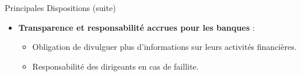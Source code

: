 \begin{frame}{Principales Dispositions (suite)}
    \begin{itemize}
        \item \textbf{Transparence et responsabilité accrues pour les banques} :
            \begin{itemize}
                \item Obligation de divulguer plus d'informations sur leurs activités financières.
                \item Responsabilité des dirigeants en cas de faillite.
            \end{itemize}
    \end{itemize}
\end{frame}